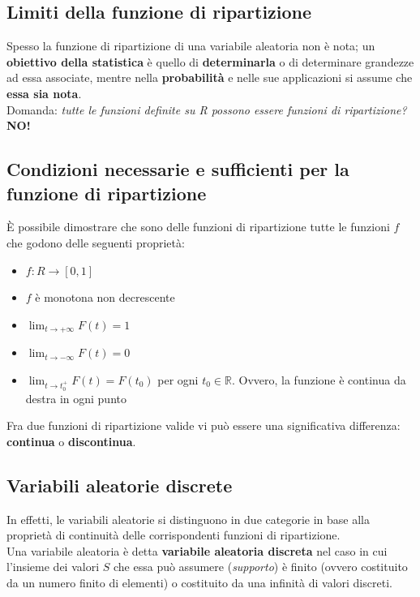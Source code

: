 \subsection{Limiti della funzione di ripartizione}
Spesso la funzione di ripartizione di una variabile aleatoria non è nota; un \textbf{obiettivo della statistica} è quello di \textbf{determinarla} o di determinare grandezze ad essa associate, mentre nella \textbf{probabilità} e nelle sue applicazioni si assume che \textbf{essa sia nota}. \\
Domanda: \textit{tutte le funzioni definite su R possono essere funzioni di ripartizione?} \textbf{NO!}

\subsection{Condizioni necessarie e sufficienti per la funzione di ripartizione}
È possibile dimostrare che sono delle funzioni di ripartizione tutte le funzioni $f$ che godono delle seguenti proprietà:
\begin{itemize}
	\item $f: R \rightarrow [0, 1]$
	\item $f$ è monotona non decrescente
	\item $\lim_{t \to +\infty} F(t) = 1$
	\item $\lim_{t \to -\infty} F(t) = 0$
	\item $\lim_{t \to t_0^{+}} F(t) = F(t_0)$ per ogni $t_0 \in \mathbb{R}$. Ovvero, la funzione è continua da destra in ogni punto 
\end{itemize}

Fra due funzioni di ripartizione valide vi può essere una significativa differenza: \textbf{continua} o \textbf{discontinua}.

\subsection{Variabili aleatorie discrete}
In effetti, le variabili aleatorie si distinguono in due categorie in base alla proprietà di continuità delle corrispondenti funzioni di ripartizione.
\\
Una variabile aleatoria è detta \textbf{variabile aleatoria discreta} nel caso in cui l'insieme dei valori $S$ che essa può assumere (\textit{supporto}) è finito (ovvero costituito da un numero finito di elementi) o costituito da una infinità di valori discreti.

